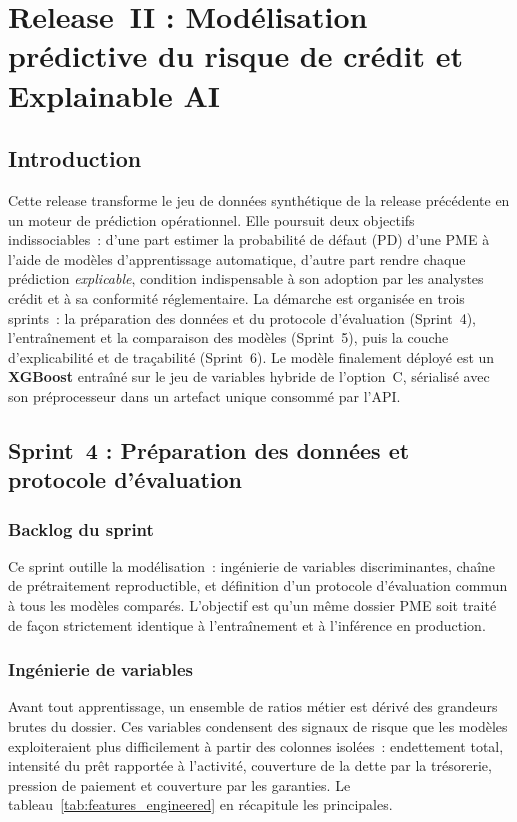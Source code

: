\documentclass[a4paper,12pt,oneside]{report}
\begin{document}
\chapter{Release~II : Modélisation prédictive du risque de crédit et Explainable AI}

\section*{Introduction}

Cette release transforme le jeu de données synthétique de la release précédente en un
moteur de prédiction opérationnel. Elle poursuit deux objectifs indissociables~: d'une
part estimer la probabilité de défaut (PD) d'une PME à l'aide de modèles d'apprentissage
automatique, d'autre part rendre chaque prédiction \emph{explicable}, condition
indispensable à son adoption par les analystes crédit et à sa conformité réglementaire.
La démarche est organisée en trois sprints~: la préparation des données et du protocole
d'évaluation (Sprint~4), l'entraînement et la comparaison des modèles (Sprint~5), puis la
couche d'explicabilité et de traçabilité (Sprint~6). Le modèle finalement déployé est un
\textbf{XGBoost} entraîné sur le jeu de variables hybride de l'option~C, sérialisé avec son
préprocesseur dans un artefact unique consommé par l'API.

\section{Sprint~4 : Préparation des données et protocole d'évaluation}

\subsection{Backlog du sprint}

Ce sprint outille la modélisation~: ingénierie de variables discriminantes, chaîne de
prétraitement reproductible, et définition d'un protocole d'évaluation commun à tous les
modèles comparés. L'objectif est qu'un même dossier PME soit traité de façon strictement
identique à l'entraînement et à l'inférence en production.

\subsection{Ingénierie de variables}

Avant tout apprentissage, un ensemble de ratios métier est dérivé des grandeurs brutes du
dossier. Ces variables condensent des signaux de risque que les modèles exploiteraient
plus difficilement à partir des colonnes isolées~: endettement total, intensité du prêt
rapportée à l'activité, couverture de la dette par la trésorerie, pression de paiement et
couverture par les garanties. Le tableau~\ref{tab:features_engineered} en récapitule les
principales.
\end{document}

